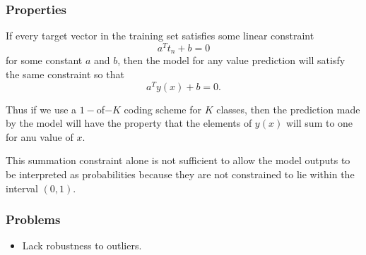 \begin{frame}
    \frametitle{Properties}

    If every target vector in the training set satisfies some linear constraint
    \begin{equation}
        a^T t_n + b = 0
    \end{equation}
for some constant $a$ and $b$, then the model for 
any value prediction will satisfy the same constraint 
so that 
\begin{equation}
    a^T y(x) + b = 0.
\end{equation}

Thus if we use a $1-$of$-K$ coding scheme for $K$ classes, 
then the prediction made by the model will 
have the property that the elements of $y(x)$
will sum to one for anu value of $x$. 

This summation constraint alone is not sufficient to 
allow the model outputs to be interpreted as 
probabilities because they are not constrained to lie
within the interval $(0,1)$. 
\end{frame}

\begin{frame}
    \frametitle{Problems}
\begin{itemize}
    \item Lack robustness to outliers. 
\end{itemize}
    

\end{frame}